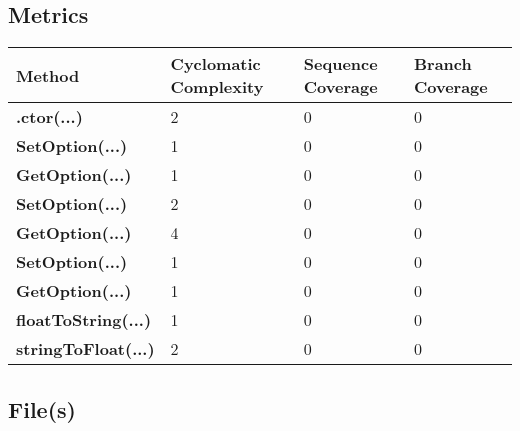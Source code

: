 \documentclass[a4paper,10pt]{article}
\begin{document}
\subsection{Metrics}
\begin{longtable}[l]{|l|l|l|l|}
\hline
\textbf{Method} & \textbf{Cyclomatic Complexity} & \textbf{Sequence Coverage} & \textbf{Branch Coverage}\\
\hline
\textbf{.ctor(...)} & 2 & 0 & 0\\
\hline
\textbf{SetOption(...)} & 1 & 0 & 0\\
\hline
\textbf{GetOption(...)} & 1 & 0 & 0\\
\hline
\textbf{SetOption(...)} & 2 & 0 & 0\\
\hline
\textbf{GetOption(...)} & 4 & 0 & 0\\
\hline
\textbf{SetOption(...)} & 1 & 0 & 0\\
\hline
\textbf{GetOption(...)} & 1 & 0 & 0\\
\hline
\textbf{floatToString(...)} & 1 & 0 & 0\\
\hline
\textbf{stringToFloat(...)} & 2 & 0 & 0\\
\hline
\end{longtable}
\subsection{File(s)}
\end{document}
